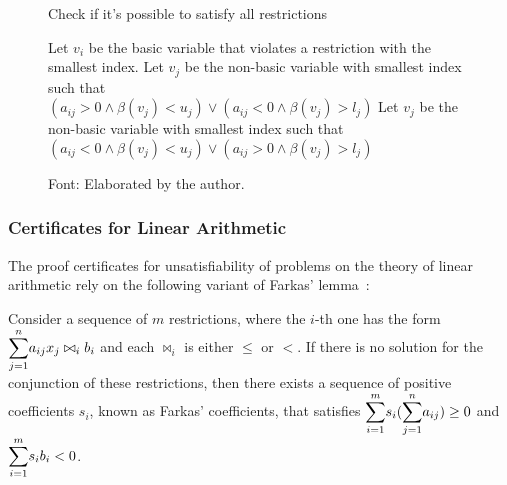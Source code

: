 \begin{figure}[t]
\caption{Check if it's possible to satisfy all restrictions}\label{check_lra}
\begin{algorithmic}[1]
    \State Let $v_{i}$ be the basic variable that violates a restriction with the smallest index.
      \State {}
    \EndIf
      \State Let $v_{j}$ be the non-basic variable with smallest index such that\\
      \qquad \qquad $(a_{ij} > 0 \wedge \beta(v_{j}) < u_{j}) \vee (a_{ij} < 0 \wedge \beta(v_{j}) > l_{j})$
        \State {}
      \EndIf
      \State {}
        \State Let $v_{j}$ be the non-basic variable with smallest index such that\\
        \qquad \qquad $(a_{ij} < 0 \wedge \beta(v_{j}) < u_{j}) \vee (a_{ij} > 0 \wedge \beta(v_{j}) > l_{j})$
          \State {}
        \EndIf
        \State {}
    \EndIf
    \State {}
  \EndFunction

\end{algorithmic}
\caption*{Font: Elaborated by the author.}
\end{figure}

\subsubsection{Certificates for Linear Arithmetic}\label{sec:liaCert}

The proof certificates for unsatisfiability of problems on the theory of linear arithmetic rely on the following variant of Farkas' lemma~\cite{farkas_ref}:

\begin{theorem}\label{farkas_lemma}
  Consider a sequence of $m$ restrictions, where the $i$-th one has the form $\mathlarger{\sum}_{j = 1}^{n} a_{ij} x_{j} \bowtie_{i} b_{i}$ and each $\bowtie_{i}$ is either $\le$ or $<$. If there is no solution for the conjunction of these restrictions, then there exists a sequence of positive coefficients $s_{i}$, known as Farkas' coefficients, that satisfies $\mathlarger{\sum}_{i = 1}^{m} s_{i} (\mathlarger{\sum}_{j = 1}^{n} a_{ij}) \ge 0$ and $\mathlarger{\sum}_{i = 1}^{m} s_{i} b_{i} < 0$.
\end{theorem}

